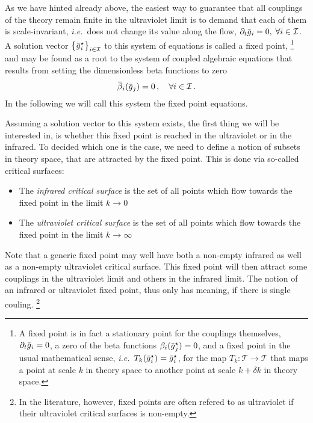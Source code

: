 \documentclass[11pt]{book}
\newcommand{\overbar}[1]{\mkern 1.5mu\overline{\mkern-1.5mu#1\mkern-1.5mu}\mkern 1.5mu}
\newcommand\ie{\textit{i.e.}\ }
\numberwithin{equation}{chapter}
\begin{document}
As we have hinted already above, the easiest way to guarantee that all
couplings of the theory remain finite in the ultraviolet limit
is to demand that each of them is scale-invariant,
\ie does not change its value along the flow,
$\partial_t \overbar g_i = 0, \; \forall i \in \mathcal I$.
A solution vector
$\big\lbrace \overbar g_i^\star \big\rbrace_{i \in \mathcal I}$
to this system of equations is called a fixed point,%
\footnote{
  A fixed point is in fact a stationary point for
  the couplings themselves,
  $\partial_t \overbar g_i = 0$,
  a zero of the beta functions
  $\beta_i (\overbar g_j^\star) = 0$,
  and a fixed point in
  the usual mathematical sense,
  \ie $T_k(\overbar g_i^\star) = \overbar g_i^\star$,
  for the map
  $T_k:\mathcal T \rightarrow \mathcal T$
  that maps a point at scale $k$ in theory space
  to another point at scale
  $k+\delta k$ in theory space.
}
and may be found as a root to the
system of coupled algebraic equations that results
from setting the dimensionless beta functions to zero%
\begin{align}
  \overbar \beta_i(\overbar g_j) = 0 \,, \quad \forall i \in \mathcal I\,.
\end{align}
In the following we will call this system the fixed point equations.

Assuming a solution vector to this system exists, the first thing we will
be interested in, is whether this fixed point is reached in the ultraviolet
or in the infrared. To decided which one is the case,
we need to define a notion of subsets in theory space, that are
attracted by the fixed point. This is done via so-called
critical surfaces:
\medskip
\begin{itemize}
  \setlength\itemsep{1.2mm}
  \item
    The \textit{infrared critical surface}
    is the set of all points which flow towards the fixed point
    in the limit $k \rightarrow 0$
  \item
    The \textit{ultraviolet critical surface}
    is the set of all points which flow towards the fixed point
    in the limit $k \rightarrow \infty$
\end{itemize}
\medskip
Note that a generic fixed point may well have both a non-empty
infrared as well as a non-empty ultraviolet critical surface.
This fixed point will then attract some couplings in the ultraviolet
limit and others in the infrared limit. The notion
of an infrared or ultraviolet fixed point,
thus only has meaning, if there is single couling.%
\footnote{%
  In the literature, however, fixed points are often refered to
  as ultraviolet if their ultraviolet critical surfaces is
  non-empty.
}
\end{document}
